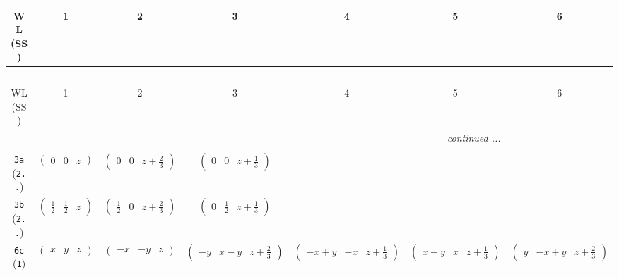 \documentclass[fleqn,9pt,landscape]{jsarticle}
\begin{document}
\begin{center}
\renewcommand{\arraystretch}{1.2}
\begin{longtable}{ccccccc}
 \hline \hline
WL (SS) & 1 & 2 & 3 & 4 & 5 & 6 \\ \hline \endfirsthead

\multicolumn{6}{l}{\tablename\ \thetable{}} \\
 \hline \hline
WL (SS) & 1 & 2 & 3 & 4 & 5 & 6 \\ \hline \endhead

 \hline \hline
\multicolumn{6}{r}{\footnotesize\it continued ...} \\ \endfoot

 \hline \hline
\multicolumn{6}{r}{} \\ \endlastfoot

{\tt 3a} ({\tt 2..}) & $ \begin{pmatrix} 0 & 0 & z \end{pmatrix} $ & $ \begin{pmatrix} 0 & 0 & z + \frac{2}{3} \end{pmatrix} $ & $ \begin{pmatrix} 0 & 0 & z + \frac{1}{3} \end{pmatrix} $ & $  $ & $  $ & $  $ \\ \hline
{\tt 3b} ({\tt 2..}) & $ \begin{pmatrix} \frac{1}{2} & \frac{1}{2} & z \end{pmatrix} $ & $ \begin{pmatrix} \frac{1}{2} & 0 & z + \frac{2}{3} \end{pmatrix} $ & $ \begin{pmatrix} 0 & \frac{1}{2} & z + \frac{1}{3} \end{pmatrix} $ & $  $ & $  $ & $  $ \\ \hline
{\tt 6c} ({\tt 1}) & $ \begin{pmatrix} x & y & z \end{pmatrix} $ & $ \begin{pmatrix} - x & - y & z \end{pmatrix} $ & $ \begin{pmatrix} - y & x - y & z + \frac{2}{3} \end{pmatrix} $ & $ \begin{pmatrix} - x + y & - x & z + \frac{1}{3} \end{pmatrix} $ & $ \begin{pmatrix} x - y & x & z + \frac{1}{3} \end{pmatrix} $ & $ \begin{pmatrix} y & - x + y & z + \frac{2}{3} \end{pmatrix} $ \\
\end{longtable}
\end{center}
\end{document}
